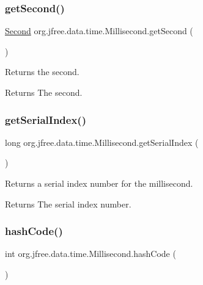 \subsubsection{\texorpdfstring{get\+Second()}{getSecond()}}
{\footnotesize\ttfamily \mbox{\hyperlink{classorg_1_1jfree_1_1data_1_1time_1_1_second}{Second}} org.\+jfree.\+data.\+time.\+Millisecond.\+get\+Second (\begin{DoxyParamCaption}{ }\end{DoxyParamCaption})}

Returns the second.

\begin{DoxyReturn}{Returns}
The second. 
\end{DoxyReturn}
\mbox{\label{classorg_1_1jfree_1_1data_1_1time_1_1_millisecond_a767fcd80fcccffc307d4aa5c1a6637f9}} 
\subsubsection{\texorpdfstring{get\+Serial\+Index()}{getSerialIndex()}}
{\footnotesize\ttfamily long org.\+jfree.\+data.\+time.\+Millisecond.\+get\+Serial\+Index (\begin{DoxyParamCaption}{ }\end{DoxyParamCaption})}

Returns a serial index number for the millisecond.

\begin{DoxyReturn}{Returns}
The serial index number. 
\end{DoxyReturn}
\mbox{\label{classorg_1_1jfree_1_1data_1_1time_1_1_millisecond_a9c8d1c89b9682ffc40d84de3f84f72ad}} 
\subsubsection{\texorpdfstring{hash\+Code()}{hashCode()}}
{\footnotesize\ttfamily int org.\+jfree.\+data.\+time.\+Millisecond.\+hash\+Code (\begin{DoxyParamCaption}{ }\end{DoxyParamCaption})}

